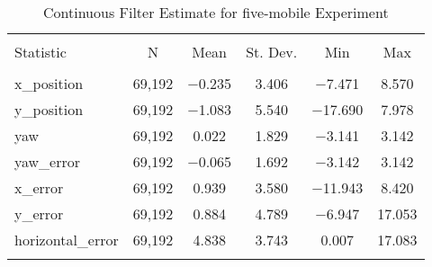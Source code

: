 
\begin{table}[h] \centering 
  \caption{Continuous Filter Estimate for five-mobile Experiment} 
  \label{tab:five_mobile_continuous_summary} 
\begin{tabular}{@{\extracolsep{5pt}}lccccc} 
\\[-1.8ex]\hline 
\hline \\[-1.8ex] 
Statistic & \multicolumn{1}{c}{N} & \multicolumn{1}{c}{Mean} & \multicolumn{1}{c}{St. Dev.} & \multicolumn{1}{c}{Min} & \multicolumn{1}{c}{Max} \\ 
\hline \\[-1.8ex] 
x\_position & 69,192 & $-$0.235 & 3.406 & $-$7.471 & 8.570 \\ 
y\_position & 69,192 & $-$1.083 & 5.540 & $-$17.690 & 7.978 \\ 
yaw & 69,192 & 0.022 & 1.829 & $-$3.141 & 3.142 \\ 
yaw\_error & 69,192 & $-$0.065 & 1.692 & $-$3.142 & 3.142 \\ 
x\_error & 69,192 & 0.939 & 3.580 & $-$11.943 & 8.420 \\ 
y\_error & 69,192 & 0.884 & 4.789 & $-$6.947 & 17.053 \\ 
horizontal\_error & 69,192 & 4.838 & 3.743 & 0.007 & 17.083 \\ 
\hline \\[-1.8ex] 
\end{tabular} 
\end{table} 
